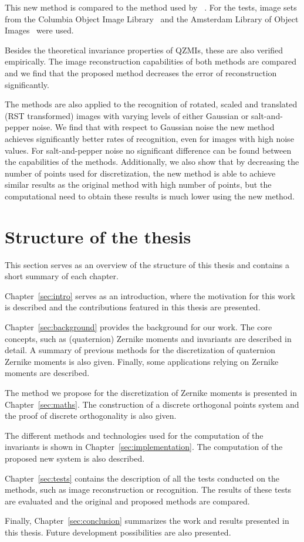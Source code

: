 This new method is compared to the method used by \citeauthor{qzmi}~\cite{qzmi}. For the tests, image sets from the Columbia Object Image Library~\cite{coil} and the Amsterdam Library of Object Images~\cite{aloi} were used. 

Besides the theoretical invariance properties of QZMIs, these are also verified empirically. The image reconstruction capabilities of both methods are compared and we find that the proposed method decreases the error of reconstruction significantly.

The methods are also applied to the recognition of rotated, scaled and translated (RST transformed) images with varying levels of either Gaussian or salt-and-pepper noise. We find that with respect to Gaussian noise the new method achieves significantly better rates of recognition, even for images with high noise values. For salt-and-pepper noise no significant difference can be found between the capabilities of the methods.
Additionally, we also show that by decreasing the number of points used for discretization, the new method is able to achieve similar results as the original method with high number of points, but the computational need to obtain these results is much lower using the new method.


\section{Structure of the thesis}
This section serves as an overview of the structure of this thesis and contains a short summary of each chapter.

Chapter~\ref{sec:intro} serves as an introduction, where the motivation for this work is described and the contributions featured in this thesis are presented.

Chapter~\ref{sec:background} provides the background for our work. The core concepts, such as (quaternion) Zernike moments and invariants are described in detail. A summary of previous methods for the discretization of quaternion Zernike moments is also given. Finally, some applications relying on Zernike moments are described.

The method we propose for the discretization of Zernike moments is presented in Chapter~\ref{sec:maths}. The construction of a discrete orthogonal points system and the proof of discrete orthogonality is also given.

The different methods and technologies used for the computation of the invariants is shown in Chapter~\ref{sec:implementation}. The computation of the proposed new system is also described.

Chapter~\ref{sec:tests} contains the description of all the tests conducted on the methods, such as image reconstruction or recognition. The results of these tests are evaluated and the original and proposed methods are compared.

Finally, Chapter~\ref{sec:conclusion} summarizes the work and results presented in this thesis. Future development possibilities are also presented. 